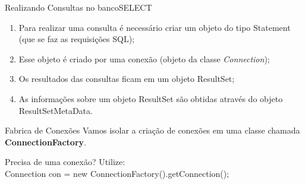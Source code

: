 \documentclass[11pt,aspectratio=43,ignorenonframetext,t]{beamer}
\begin{document}
\begin{frame}{Realizando Consultas no banco}{SELECT}
  \begin{enumerate}
   \item Para realizar uma consulta é necessário criar um objeto do tipo Statement (que se faz as requisições SQL);
   \item Esse objeto é criado por uma conexão (objeto da classe \textit{Connection});
    \item Os resultados das consultas ficam em um objeto ResultSet;
    \item As informações sobre um objeto ResultSet são obtidas através do objeto ResultSetMetaData.
  \end{enumerate}

\end{frame}



\begin{frame}{Fabrica de Conexões}
Vamos isolar a criação de conexões em uma classe chamada \textbf{ConnectionFactory}.
\begin{center}
 \end{center}
 Precisa de uma conexão? Utilize:\\
 Connection con = new ConnectionFactory().getConnection();
\end{frame}
\end{document}
